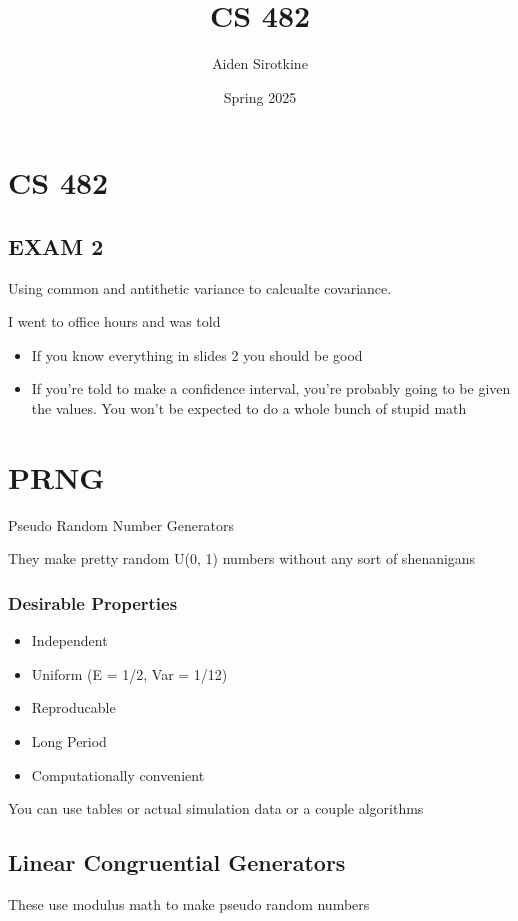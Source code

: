 \documentclass[fleqn]{report}
\date{Spring 2025}
\title{CS 482}
\author{Aiden Sirotkine}
\begin{document}
\graphicspath{ {../Images/} }
\pagestyle{fancy}
\maketitle
\tableofcontents
\clearpage

\chapter{CS 482}
\section{EXAM 2}
Using common and antithetic variance to calcualte covariance. 

I went to office hours and was told 
\begin{itemize}
    \item 
    If you know everything in slides 2 you should be good 
    \item 
    If you're told to make a confidence interval, you're probably 
    going to be given the values. You won't be expected to do a whole 
    bunch of stupid math 
\end{itemize}

\chapter{PRNG}
Pseudo Random Number Generators 

They make pretty random U(0, 1) numbers without any sort of shenanigans 

\subsection{Desirable Properties}
\begin{itemize}
    \item 
    Independent 
    \item 
    Uniform (E = 1/2, Var = 1/12)
    \item 
    Reproducable 
    \item 
    Long Period 
    \item 
    Computationally convenient 
\end{itemize}

You can use tables or actual simulation data or a couple algorithms 

\section{Linear Congruential Generators}
These use modulus math to make pseudo random numbers 
\end{document}
